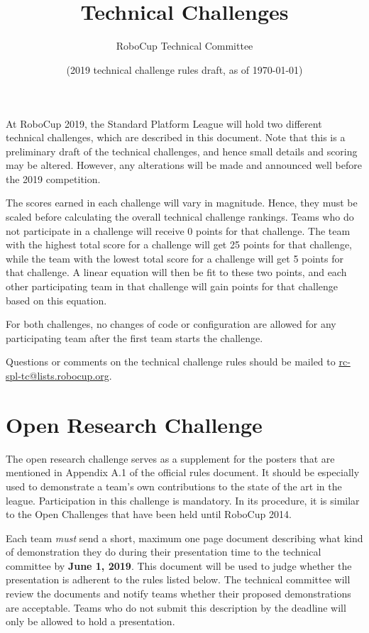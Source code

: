 \documentclass[12pt]{article}
\title{\leaguename\\Technical Challenges}
\author{RoboCup Technical Committee}
\date{(2019 technical challenge rules draft, as of \today)}
\begin{document}
\maketitle

At RoboCup 2019, the Standard Platform League will hold two different technical challenges, which are described in this document. Note that this is a preliminary draft of the technical challenges, and hence small details and scoring may be altered. However, any alterations will be made and announced well before the 2019 competition.

The scores earned in each challenge will vary in magnitude. Hence, they must be scaled before calculating the overall technical challenge rankings. Teams who do not participate in a challenge will receive 0 points for that challenge. The team with the highest total score for a challenge will get 25 points for that challenge, while the team with the lowest total score for a challenge will get 5 points for that challenge. A linear equation will then be fit to these two points, and each other participating team in that challenge will gain points for that challenge based on this equation.

For both challenges, no changes of code or configuration are allowed for any participating team after the first team starts the challenge.

Questions or comments on the technical challenge rules should be mailed to \url{rc-spl-tc@lists.robocup.org}.

\vfill
\tableofcontents
\setcounter{tocdepth}{3}
\thispagestyle{fancy}
\clearpage
\cfoot{\thepage}
\setcounter{page}{1}

\section{Open Research Challenge}

The open research challenge serves as a supplement for the posters that are mentioned in Appendix A.1 of the official rules document. It should be especially used to demonstrate a team's own contributions to the state of the art in the league. Participation in this challenge is mandatory. In its procedure, it is similar to the Open Challenges that have been held until RoboCup 2014.

Each team \emph{must} send a short, maximum one page document describing what kind of demonstration they do during their presentation time to the technical committee by \textbf{June 1, 2019}. This document will be used to judge whether the presentation is adherent to the rules listed below. The technical committee will review the documents and notify teams whether their proposed demonstrations are acceptable. Teams who do not submit this description by the deadline will only be allowed to hold a presentation.
\end{document}

